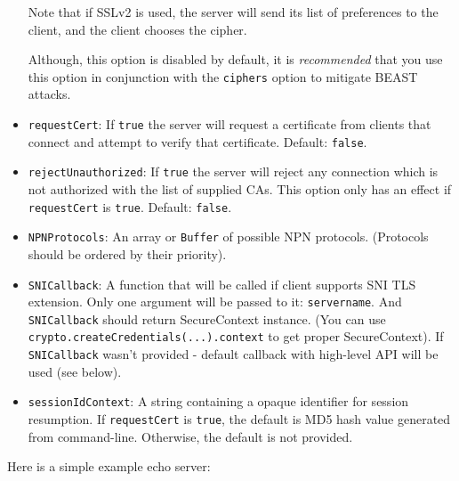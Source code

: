 \begin{itemize}
  Note that if SSLv2 is used, the server will send its list of
  preferences to the client, and the client chooses the cipher.

  Although, this option is disabled by default, it is \emph{recommended}
  that you use this option in conjunction with the \texttt{ciphers}
  option to mitigate BEAST attacks.
\item
  \texttt{requestCert}: If \texttt{true} the server will request a
  certificate from clients that connect and attempt to verify that
  certificate. Default: \texttt{false}.
\item
  \texttt{rejectUnauthorized}: If \texttt{true} the server will reject
  any connection which is not authorized with the list of supplied CAs.
  This option only has an effect if \texttt{requestCert} is
  \texttt{true}. Default: \texttt{false}.
\item
  \texttt{NPNProtocols}: An array or \texttt{Buffer} of possible NPN
  protocols. (Protocols should be ordered by their priority).
\item
  \texttt{SNICallback}: A function that will be called if client
  supports SNI TLS extension. Only one argument will be passed to it:
  \texttt{servername}. And \texttt{SNICallback} should return
  SecureContext instance. (You can use
  \texttt{crypto.createCredentials(...).context} to get proper
  SecureContext). If \texttt{SNICallback} wasn't provided - default
  callback with high-level API will be used (see below).
\item
  \texttt{sessionIdContext}: A string containing a opaque identifier for
  session resumption. If \texttt{requestCert} is \texttt{true}, the
  default is MD5 hash value generated from command-line. Otherwise, the
  default is not provided.
\end{itemize}

Here is a simple example echo server:

